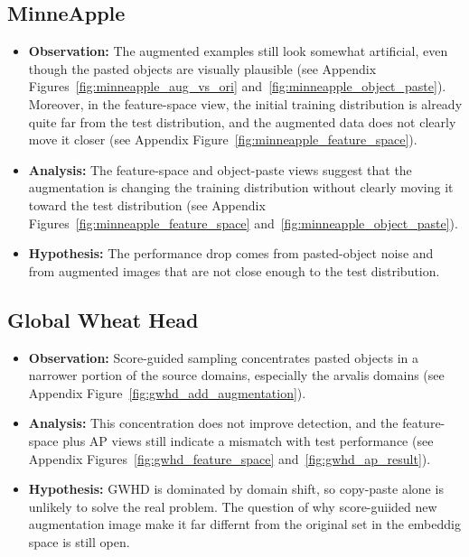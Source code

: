 \documentclass[11pt, a4paper]{article}
\begin{document}
\subsection{MinneApple}
\begin{itemize}
\item \textbf{Observation:} The augmented examples still look somewhat artificial, even though the pasted objects are visually plausible (see Appendix Figures~\ref{fig:minneapple_aug_vs_ori} and~\ref{fig:minneapple_object_paste}). Moreover, in the feature-space view, the initial training distribution is already quite far from the test distribution, and the augmented data does not clearly move it closer (see Appendix Figure~\ref{fig:minneapple_feature_space}).
\item \textbf{Analysis:} The feature-space and object-paste views suggest that the augmentation is changing the training distribution without clearly moving it toward the test distribution (see Appendix Figures~\ref{fig:minneapple_feature_space} and~\ref{fig:minneapple_object_paste}). 
\item \textbf{Hypothesis:} The performance drop comes from pasted-object noise and from augmented images that are not close enough to the test distribution.
\end{itemize}

\subsection{Global Wheat Head}
\begin{itemize}
\item \textbf{Observation:} Score-guided sampling concentrates pasted objects in a narrower portion of the source domains, especially the arvalis domains (see Appendix Figure~\ref{fig:gwhd_add_augmentation}).
\item \textbf{Analysis:} This concentration does not improve detection, and the feature-space plus AP views still indicate a mismatch with test performance (see Appendix Figures~\ref{fig:gwhd_feature_space} and~\ref{fig:gwhd_ap_result}).
\item \textbf{Hypothesis:} GWHD is dominated by domain shift, so copy-paste alone is unlikely to solve the real problem. The question of why score-guiided new augmentation image make it far differnt from the original set in the embeddig space is still open.
\end{itemize}
\end{document}
